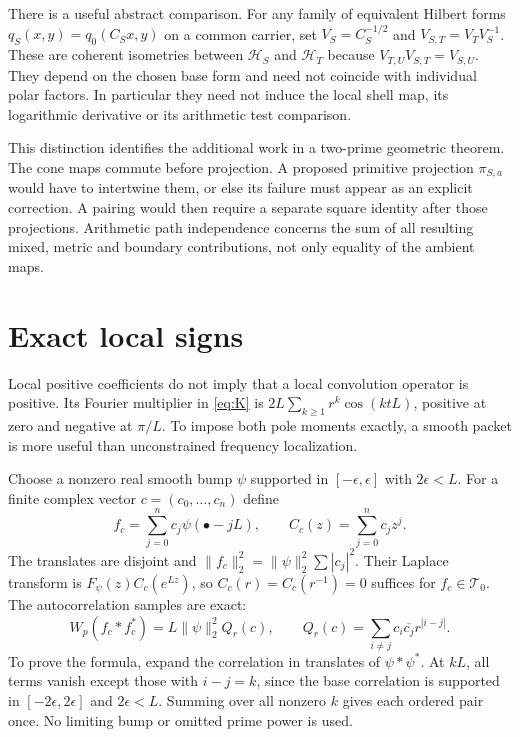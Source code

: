 \documentclass[11pt,letterpaper]{article}
\theoremstyle{definition}
\theoremstyle{remark}
\newcommand{\T}{\mathcal T}
\begin{document}
There is a useful abstract comparison. For any family of equivalent
Hilbert forms $q_S(x,y)=q_0(C_Sx,y)$ on a common carrier, set
$V_S=C_S^{-1/2}$ and $V_{S,T}=V_TV_S^{-1}$. These are coherent
isometries between $\mathcal H_S$ and $\mathcal H_T$ because
$V_{T,U}V_{S,T}=V_{S,U}$. They depend on the chosen base form
and need not coincide with individual polar factors. In
particular they need not induce the local shell map, its
logarithmic derivative or its arithmetic test comparison.

This distinction identifies the additional work in a two-prime
geometric theorem. The cone maps commute before projection.
A proposed primitive projection $\pi_{S,a}$ would have to intertwine
them, or else its failure must appear as an explicit correction.
A pairing would then require a separate square identity after
those projections. Arithmetic path independence concerns the
sum of all resulting mixed, metric and boundary contributions,
not only equality of the ambient maps.

\section{Exact local signs}

Local positive coefficients do not imply that a local convolution
operator is positive. Its Fourier multiplier in \eqref{eq:K} is
$2L\sum_{k\ge1}r^k\cos(ktL)$, positive at zero and negative at
$\pi/L$. To impose both pole moments exactly, a smooth packet is
more useful than unconstrained frequency localization.

Choose a nonzero real smooth bump $\psi$ supported in
$[-\epsilon,\epsilon]$ with $2\epsilon<L$. For a finite complex
vector $c=(c_0,\ldots,c_n)$ define
\begin{equation}
 f_c=\sum_{j=0}^n c_j\psi(\bullet-jL),\qquad
 C_c(z)=\sum_{j=0}^nc_jz^j.
 \label{eq:packet}
\end{equation}
The translates are disjoint and
$\|f_c\|_2^2=\|\psi\|_2^2\sum|c_j|^2$.
Their Laplace transform is $F_\psi(z)C_c(e^{Lz})$, so
$C_c(r)=C_c(r^{-1})=0$ suffices for $f_c\in\T_0$.
The autocorrelation samples are exact:
\begin{equation}
 W_p(f_c*f_c^*)=L\|\psi\|_2^2Q_r(c),\qquad
 Q_r(c)=\sum_{i\ne j}c_i\overline{c_j}r^{|i-j|}.
 \label{eq:Q}
\end{equation}
To prove the formula, expand the correlation in translates of
$\psi*\psi^*$. At $kL$, all terms vanish except those with
$i-j=k$, since the base correlation is supported in
$[-2\epsilon,2\epsilon]$ and $2\epsilon<L$.
Summing over all nonzero $k$ gives each
ordered pair once. No limiting bump or omitted prime power is
used.
\end{document}
